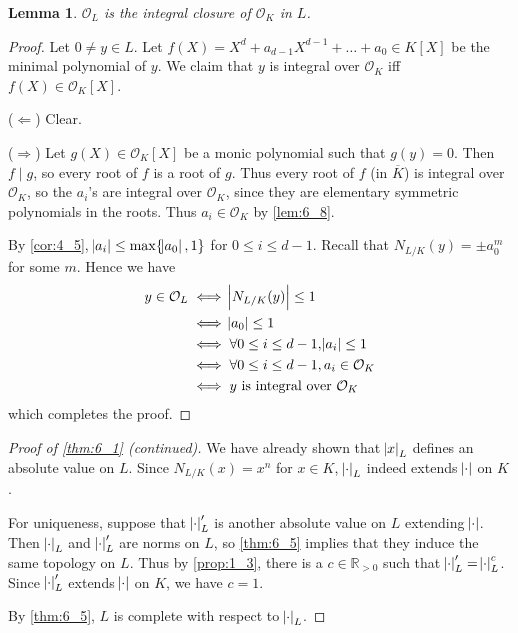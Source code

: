 \documentclass[11pt]{article}
\theoremstyle{definition}
\theoremstyle{plain}
\newtheorem{lemma}[definition]{Lemma}
\theoremstyle{remark}
\newcommand{\RR}{\mathbb{R}}
\newcommand{\cO}{\mathcal{O}}
\begin{document}
\begin{lemma}\label{lem:6_9}
    $\cO_L$ is the integral closure of $\cO_K$ in $L$.
\end{lemma}
\begin{proof}
    Let $0 \neq y \in L$. Let $f(X) = X^d + a_{d-1} X^{d-1} + \ldots + a_0 \in K[X]$ be the minimal polynomial of $y$. We claim that $y$ is integral over $\cO_K$ iff $f(X) \in \cO_K[X]$.

    \noindent ($\Leftarrow$) Clear.

    \noindent ($\Rightarrow$) Let $g(X) \in \cO_K[X]$ be a monic polynomial such that $g(y) = 0$. Then $f \mid g$, so every root of $f$ is a root of $g$. Thus every root of $f$ (in $\overline{K}$) is integral over $\cO_K$, so the $a_i$'s are integral over $\cO_K$, since they are elementary symmetric polynomials in the roots. Thus $a_i \in \cO_K$ by \autoref{lem:6_8}.

    By \autoref{cor:4_5}, $\abs{a_i} \le \max\{\abs{a_0}, 1\}$ for $0 \le i \le d - 1$. Recall that $N_{L/K}(y) = \pm a_0^m$ for some $m$. Hence we have
    \begin{align*}
        y \in \cO_L
        &\iff \abs{N_{L/K}(y)} \le 1\\
        &\iff \abs{a_0} \le 1\\
        &\iff \forall 0 \le i \le d - 1, \abs{a_i} \le 1\\
        &\iff \forall 0 \le i \le d - 1, a_i \in \cO_K\\
        &\iff y \text{ is integral over } \cO_K
    \end{align*}
    which completes the proof.
\end{proof}

\begin{proof}[Proof of \autoref{thm:6_1} (continued)]
    We have already shown that $\abs{x}_L$ defines an absolute value on $L$. Since $N_{L/K}(x) = x^n$ for $x \in K$, $\abs{\cdot}_L$ indeed extends $\abs{\cdot}$ on $K$.

    For uniqueness, suppose that $\abs{\cdot}'_L$ is another absolute value on $L$ extending $\abs{\cdot}$. Then $\abs{\cdot}_L$ and $\abs{\cdot}'_L$ are norms on $L$, so \autoref{thm:6_5} implies that they induce the same topology on $L$. Thus by \autoref{prop:1_3}, there is a $c \in \RR_{>0}$ such that $\abs{\cdot}'_L = \abs{\cdot}_L^c$. Since $\abs{\cdot}'_L$ extends $\abs{\cdot}$ on $K$, we have $c = 1$.

    By \autoref{thm:6_5}, $L$ is complete with respect to $\abs{\cdot}_L$.
\end{proof}
\end{document}
